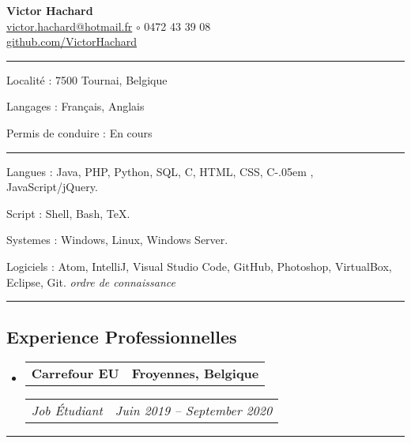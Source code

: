 \documentclass[10pt,letterpaper]{article}
\makeatletter
\newcommand{\Csharp}{%
  {\settoheight{\dimen0}{C}C\kern-.05em \resizebox{!}{\dimen0}{\raisebox{\depth}{\#}}}}
\newenvironment{indentsection}[1]
{\begin{list}{}
  {\setlength{\leftmargin}{#1}} \item[]
}
{\end{list}}
\newcommand{\headerrow}[2]
{\begin{tabular*}{\linewidth}{l@{\extracolsep{\fill}}r}
  #1 &
  #2 \\
\end{tabular*}}
\makeatother
\begin{document}
\begin{center}
  \huge \textbf{Victor Hachard} \\
  \large
  \href{mailto:victor.hachard@hotmail.fr}{victor.hachard@hotmail.fr}
  $\circ$
  0472 43 39 08
  \\
  \href{http://www.github.com/VictorHachard}{github.com/VictorHachard}
  \vspace{-0.2em}
\end{center}


\hrule
\begin{indentsection}{\parindent}
\begin{description*}
  \item[Localité :] 7500 Tournai, Belgique
  \item[Langages :] Français, Anglais
  \item[Permis de conduire :] En cours
\end{description*}
\end{indentsection}


\hrule
\begin{indentsection}{\parindent}
\begin{description*}
  \item[Langues :] Java, PHP, Python, SQL, C, HTML, CSS, \Csharp,
  JavaScript/jQuery.
  \item[Script :] Shell, Bash, TeX.
  \item[Systemes :] Windows, Linux, Windows Server.
  \item[Logiciels :] Atom, IntelliJ, Visual Studio Code, GitHub, Photoshop,
  VirtualBox, Eclipse, Git. \null\hfill\emph{ordre de connaissance}
\end{description*}
\end{indentsection}


\hrule
\vspace{-0.4em}
\subsection*{Experience Professionnelles}
\begin{itemize}
  \parskip=0.1em

  \item
  \headerrow
    {\textbf{Carrefour EU}}
    {\textbf{Froyennes, Belgique}}
  \headerrow
    {\emph{Job Étudiant}}
    {\emph{Juin 2019 -- September 2020}}
  \end{itemize}


\hrule
\vspace{-0.4em}
\end{document}
